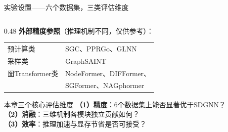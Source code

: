 \documentclass[aspectratio=169,9pt,xcolor=dvipsnames]{beamer}
\begin{document}
\begin{frame}{实验设置——六个数据集，三类评估维度}
\begin{columns}[T]
\begin{column}{0.48\textwidth}
  \medskip
  \textbf{外部精度参照}（推理机制不同，仅供参考）：

  \medskip
  \begin{tabular}{ll}
    预计算类 & SGC、PPRGo、GLNN \\[3pt]
    采样类 & GraphSAINT \\[3pt]
    图Transformer类 & NodeFormer、DIFFormer、\\
     & SGFormer、NAGphormer \\
  \end{tabular}

  \medskip
  \begin{alertblock}{本章三个核心评估维度}
    \textbf{（1）精度}：6个数据集上能否显著优于SDGNN？\\[3pt]
    \textbf{（2）消融}：三维机制各模块独立贡献如何？\\[3pt]
    \textbf{（3）效率}：推理加速与显存节省是否可接受？
  \end{alertblock}
\end{column}
\end{columns}
\end{frame}
\end{document}
